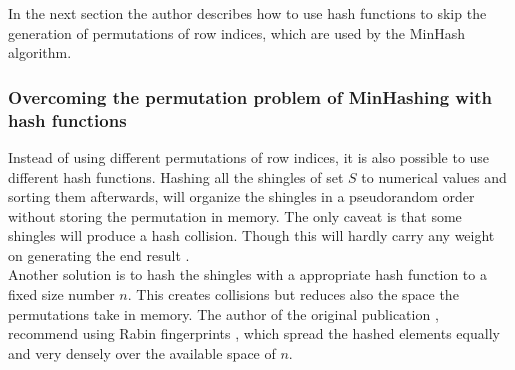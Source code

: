 In the next section the author describes how to use hash functions to skip the generation of permutations of row indices, which are used by the MinHash algorithm.\\

\subsubsection{Overcoming the permutation problem of MinHashing with hash functions} Instead of using different permutations of row indices, it is also possible to use different hash functions. Hashing all the shingles of set $ S $ to numerical values and sorting them afterwards, will organize the shingles in a pseudorandom order without storing the permutation in memory. The only caveat is that some shingles will produce a hash collision. Though this will hardly carry any weight on generating the end result \cite{minhash}.\\

Another solution is to hash the shingles with a appropriate hash function to a fixed size number $ n $. This creates collisions but reduces also the space the permutations take in memory. The author of the original publication \cite{minhash}, recommend using Rabin fingerprints \cite{rabinFingerprinting}, which spread the hashed elements equally and very densely over the available space of $ n $.\\